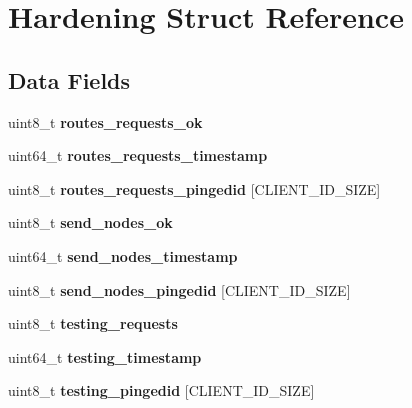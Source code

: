 \hypertarget{struct_hardening}{\section{Hardening Struct Reference}
\label{struct_hardening}
}
\subsection*{Data Fields}
\begin{DoxyCompactItemize}
\item 
\hypertarget{struct_hardening_a3bc4c156861571ceca55275d95f6221b}{uint8\+\_\+t {\bfseries routes\+\_\+requests\+\_\+ok}}\label{struct_hardening_a3bc4c156861571ceca55275d95f6221b}

\item 
\hypertarget{struct_hardening_a55d6293fa06a8c4aa24e70706409b060}{uint64\+\_\+t {\bfseries routes\+\_\+requests\+\_\+timestamp}}\label{struct_hardening_a55d6293fa06a8c4aa24e70706409b060}

\item 
\hypertarget{struct_hardening_a7584df55876ac376c81e898ee9330252}{uint8\+\_\+t {\bfseries routes\+\_\+requests\+\_\+pingedid} \mbox{[}C\+L\+I\+E\+N\+T\+\_\+\+I\+D\+\_\+\+S\+I\+Z\+E\mbox{]}}\label{struct_hardening_a7584df55876ac376c81e898ee9330252}

\item 
\hypertarget{struct_hardening_a11158e002f3685f4044a759680636c08}{uint8\+\_\+t {\bfseries send\+\_\+nodes\+\_\+ok}}\label{struct_hardening_a11158e002f3685f4044a759680636c08}

\item 
\hypertarget{struct_hardening_ab15e3d8f0b33943a6978fac3cde4d1a2}{uint64\+\_\+t {\bfseries send\+\_\+nodes\+\_\+timestamp}}\label{struct_hardening_ab15e3d8f0b33943a6978fac3cde4d1a2}

\item 
\hypertarget{struct_hardening_a59f91ceb04458977efc382087786c86e}{uint8\+\_\+t {\bfseries send\+\_\+nodes\+\_\+pingedid} \mbox{[}C\+L\+I\+E\+N\+T\+\_\+\+I\+D\+\_\+\+S\+I\+Z\+E\mbox{]}}\label{struct_hardening_a59f91ceb04458977efc382087786c86e}

\item 
\hypertarget{struct_hardening_a48c7621d77e824da8df2c8a7caa79d25}{uint8\+\_\+t {\bfseries testing\+\_\+requests}}\label{struct_hardening_a48c7621d77e824da8df2c8a7caa79d25}

\item 
\hypertarget{struct_hardening_a3de9f4ec78dd99c4ca1a142e1c65fcee}{uint64\+\_\+t {\bfseries testing\+\_\+timestamp}}\label{struct_hardening_a3de9f4ec78dd99c4ca1a142e1c65fcee}

\item 
\hypertarget{struct_hardening_a8448dd62435977cefffe69d71c8b667d}{uint8\+\_\+t {\bfseries testing\+\_\+pingedid} \mbox{[}C\+L\+I\+E\+N\+T\+\_\+\+I\+D\+\_\+\+S\+I\+Z\+E\mbox{]}}\label{struct_hardening_a8448dd62435977cefffe69d71c8b667d}

\end{DoxyCompactItemize}


